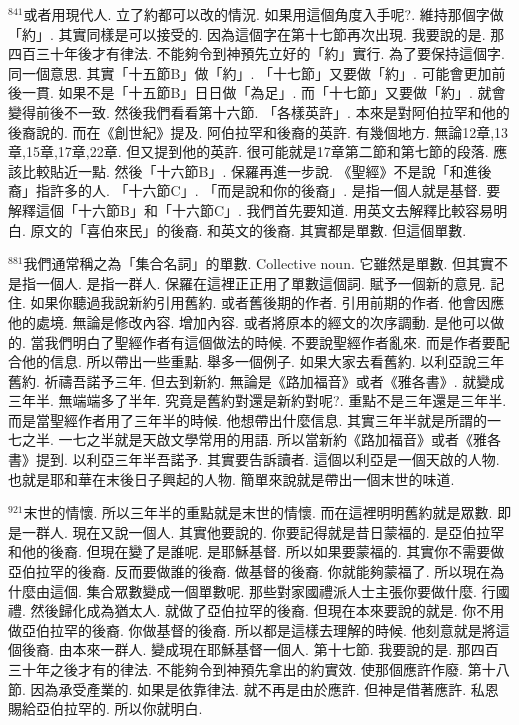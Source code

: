 \documentclass{book}
\begin{document}
$^{841}$或者用現代人.
立了約都可以改的情況.
如果用這個角度入手呢?.
維持那個字做「約」.
其實同樣是可以接受的.
因為這個字在第十七節再次出現.
我要說的是.
那四百三十年後才有律法.
不能夠令到神預先立好的「約」實行.
為了要保持這個字.
同一個意思.
其實「十五節B」做「約」.
「十七節」又要做「約」.
可能會更加前後一貫.
如果不是「十五節B」日日做「為足」.
而「十七節」又要做「約」.
就會變得前後不一致.
然後我們看看第十六節.
「各樣英許」.
本來是對阿伯拉罕和他的後裔說的.
而在《創世紀》提及.
阿伯拉罕和後裔的英許.
有幾個地方.
無論12章,13章,15章,17章,22章.
但又提到他的英許.
很可能就是17章第二節和第七節的段落.
應該比較貼近一點.
然後「十六節B」.
保羅再進一步說.
《聖經》不是說「和進後裔」指許多的人.
「十六節C」.
「而是說和你的後裔」.
是指一個人就是基督.
要解釋這個「十六節B」和「十六節C」.
我們首先要知道.
用英文去解釋比較容易明白.
原文的「喜伯來民」的後裔.
和英文的後裔.
其實都是單數.
但這個單數.

$^{881}$我們通常稱之為「集合名詞」的單數.
Collective noun.
它雖然是單數.
但其實不是指一個人.
是指一群人.
保羅在這裡正正用了單數這個詞.
賦予一個新的意見.
記住.
如果你聽過我說新約引用舊約.
或者舊後期的作者.
引用前期的作者.
他會因應他的處境.
無論是修改內容.
增加內容.
或者將原本的經文的次序調動.
是他可以做的.
當我們明白了聖經作者有這個做法的時候.
不要說聖經作者亂來.
而是作者要配合他的信息.
所以帶出一些重點.
舉多一個例子.
如果大家去看舊約.
以利亞說三年舊約.
祈禱吾諾予三年.
但去到新約.
無論是《路加福音》或者《雅各書》.
就變成三年半.
無端端多了半年.
究竟是舊約對還是新約對呢?.
重點不是三年還是三年半.
而是當聖經作者用了三年半的時候.
他想帶出什麼信息.
其實三年半就是所謂的一七之半.
一七之半就是天啟文學常用的用語.
所以當新約《路加福音》或者《雅各書》提到.
以利亞三年半吾諾予.
其實要告訴讀者.
這個以利亞是一個天啟的人物.
也就是耶和華在末後日子興起的人物.
簡單來說就是帶出一個末世的味道.

$^{921}$末世的情懷.
所以三年半的重點就是末世的情懷.
而在這裡明明舊約就是眾數.
即是一群人.
現在又說一個人.
其實他要說的.
你要記得就是昔日蒙福的.
是亞伯拉罕和他的後裔.
但現在變了是誰呢.
是耶穌基督.
所以如果要蒙福的.
其實你不需要做亞伯拉罕的後裔.
反而要做誰的後裔.
做基督的後裔.
你就能夠蒙福了.
所以現在為什麼由這個.
集合眾數變成一個單數呢.
那些對家國禮派人士主張你要做什麼.
行國禮.
然後歸化成為猶太人.
就做了亞伯拉罕的後裔.
但現在本來要說的就是.
你不用做亞伯拉罕的後裔.
你做基督的後裔.
所以都是這樣去理解的時候.
他刻意就是將這個後裔.
由本來一群人.
變成現在耶穌基督一個人.
第十七節.
我要說的是.
那四百三十年之後才有的律法.
不能夠令到神預先拿出的約實效.
使那個應許作廢.
第十八節.
因為承受產業的.
如果是依靠律法.
就不再是由於應許.
但神是借著應許.
私恩賜給亞伯拉罕的.
所以你就明白.
\end{document}
